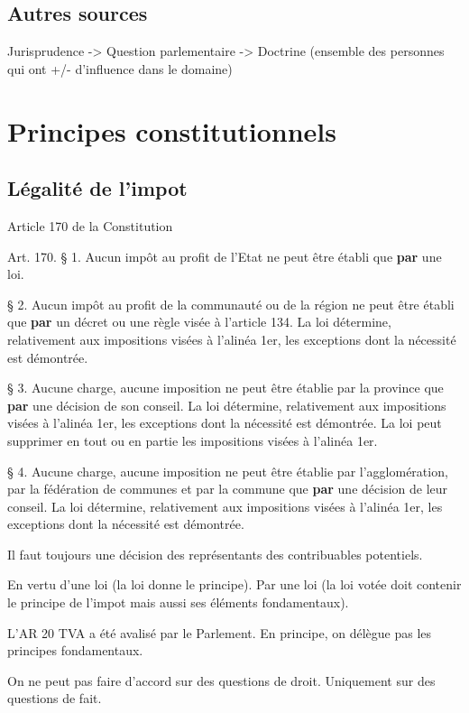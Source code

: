 \documentclass{book}
\begin{document}
\section{Autres sources}

Jurisprudence
->
Question parlementaire
-> 
Doctrine (ensemble des personnes qui ont +/- d'influence dans le domaine)

\chapter{Principes constitutionnels}

\section{Légalité de l'impot}

Article 170 de la Constitution

Art. 170. § 1. Aucun impôt au profit de l'Etat ne peut être établi que \textbf{par} une loi.

  § 2. Aucun impôt au profit de la communauté ou de la région ne peut être établi que \textbf{par} un décret ou une règle visée à l'article 134. La loi détermine, relativement aux impositions visées à l'alinéa 1er, les exceptions dont la nécessité est démontrée.

  § 3. Aucune charge, aucune imposition ne peut être établie par la province que \textbf{par} une décision de son conseil. La loi détermine, relativement aux impositions visées à l'alinéa 1er, les exceptions dont la nécessité est démontrée. La loi peut supprimer en tout ou en partie les impositions visées à l'alinéa 1er.

  § 4. Aucune charge, aucune imposition ne peut être établie par l'agglomération, par la fédération de communes et par la commune que \textbf{par} une décision de leur conseil.  La loi détermine, relativement aux impositions visées à l'alinéa 1er, les exceptions dont la nécessité est démontrée.
  
  Il faut toujours une décision des représentants des contribuables potentiels.
  
  En vertu d'une loi (la loi donne le principe). Par une loi (la loi votée doit contenir le principe de l'impot mais aussi ses éléments fondamentaux).
  
  L'AR 20 TVA a été avalisé par le Parlement. En principe, on délègue pas les principes fondamentaux.
 
 On ne peut pas faire d'accord sur des questions de droit. Uniquement sur des questions de fait.
 
\end{document}
